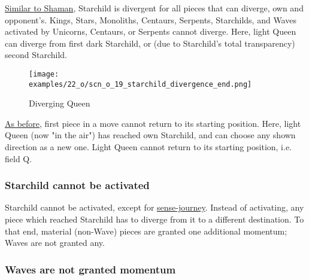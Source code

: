 \vspace*{-0.5\baselineskip}
\hyperref[fig:scn_cot_11_own_shaman_is_divergent_init]{Similar to Shaman},
Starchild is divergent for all pieces that can diverge, own and opponent's.
Kings, Stars, Monoliths, Centaurs, Serpents, Starchilds, and Waves activated
by Unicorns, Centaurs, or Serpents cannot diverge. Here, light Queen can
diverge from first dark Starchild, or (due to Starchild's total transparency)
second Starchild.

\vspace*{-0.9\baselineskip}
\noindent
\begin{figure}[!h]
\texttt{[image: examples/22\_o/scn\_o\_19\_starchild\_divergence\_end.png]}
\vspace*{-1.4\baselineskip}
\caption{Diverging Queen}
\label{fig:scn_o_19_starchild_divergence_end}
\end{figure}

\vspace*{-0.5\baselineskip}
\hyperref[fig:scn_cot_36_diverging_first_piece]{As before}, first piece in a move
cannot return to its starting position. Here, light Queen (now "in the air") has
reached own Starchild, and can choose any shown direction as a new one. Light Queen
cannot return to its starting position, i.e. field Q.

\clearpage %

\subsubsection*{Starchild cannot be activated}
\label{sec:One/Starchild/Divergence/Starchild cannot be activated}

\vspace*{-0.7\baselineskip}
Starchild cannot be activated, except for
\hyperref[sec:One/Starchild/Sense-journey]{sense-journey}.
Instead of activating, any piece which reached Starchild has to diverge from it to
a different destination. To that end, material (non-Wave) pieces are granted one
additional momentum; Waves are not granted any. %

\vspace*{-1.1\baselineskip}
\subsubsection*{Waves are not granted momentum}
\label{sec:One/Starchild/Divergence/Waves are not granted momentum}

